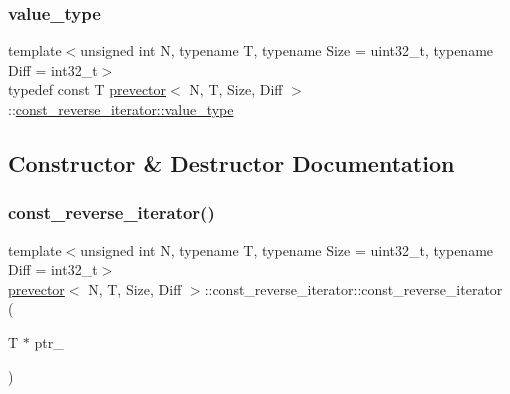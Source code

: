 \subsubsection{\texorpdfstring{value\+\_\+type}{value\_type}}
{\footnotesize\ttfamily template$<$unsigned int N, typename T, typename Size = uint32\+\_\+t, typename Diff = int32\+\_\+t$>$ \\
typedef const T \mbox{\hyperlink{classprevector}{prevector}}$<$ N, T, Size, Diff $>$\+::\mbox{\hyperlink{classprevector_1_1const__reverse__iterator_ade957c473a494e6d51f240459e8a233f}{const\+\_\+reverse\+\_\+iterator\+::value\+\_\+type}}}



\subsection{Constructor \& Destructor Documentation}
\mbox{\label{classprevector_1_1const__reverse__iterator_a8317a6e533f8ff746c935826be41446c}} 
\subsubsection{\texorpdfstring{const\+\_\+reverse\+\_\+iterator()}{const\_reverse\_iterator()}\hspace{0.1cm}{\footnotesize\ttfamily [1/2]}}
{\footnotesize\ttfamily template$<$unsigned int N, typename T, typename Size = uint32\+\_\+t, typename Diff = int32\+\_\+t$>$ \\
\mbox{\hyperlink{classprevector}{prevector}}$<$ N, T, Size, Diff $>$\+::const\+\_\+reverse\+\_\+iterator\+::const\+\_\+reverse\+\_\+iterator (\begin{DoxyParamCaption}\item[{T $\ast$}]{ptr\+\_\+ }\end{DoxyParamCaption})\hspace{0.3cm}{\ttfamily [inline]}}

\mbox{\label{classprevector_1_1const__reverse__iterator_aa30b052fbfc36a374d6f97afda55cb2b}} 
